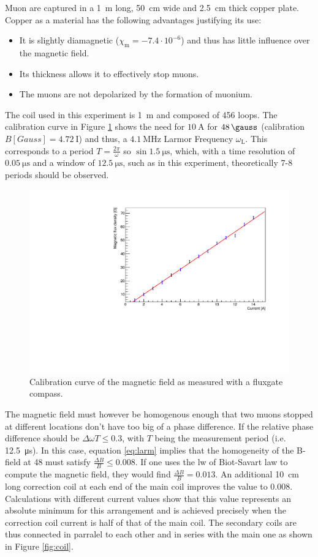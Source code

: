 Muon are captured in a \SI{1}{\meter} long, \SI{50}{\centi\meter} wide and \SI{2.5}{\centi\meter} thick copper plate. Copper as a material has the following advantages justifying its use:

\begin{itemize}
\item It is slightly diamagnetic ($\chi_{\text{m}}=-7.4 \cdot 10^{-6}$) and thus has little influence over the magnetic field.
\item Its thickness allows it to effectively stop muons.
\item The muons are not depolarized by the formation of muonium.
\end{itemize}

The coil used in this experiment is \SI{1}{\meter} and composed of 456 loops. The calibration curve in Figure \ref{fig:magcal} shows the need for $\SI{10}{\ampere}$ for $\SI{48}{\gauss}$ (calibration $B[Gauss]=\SI{4.72}{\text{I}}$) and thus, a $\SI{4.1}{\mega\hertz}$ Larmor Frequency $\omega_{\text{L}}$. This corresponds to a period $T=\frac{2\pi}{\omega}$ so $\sin \SI{1.5}{\micro\second}$, which, with a time resolution of $\SI{0.05}{\micro\second}$ and a window of $\SI{12.5}{\micro\second}$, such as in this experiment, theoretically 7-8 periods should be observed.

\begin{figure}[htbp]
\centering
\includegraphics[width=0.7\linewidth]{./fig/magcal.pdf}
\caption{Calibration curve of the magnetic field as measured with a fluxgate compass.}
\label{fig:magcal}
\end{figure}


The magnetic field must however be homogenous enough that two muons stopped at different locations don't have too big of a phase difference. If the relative phase difference should be $\Delta\omega T \leq 0.3$, with $T$ being the measurement period (i.e. \SI{12.5}{\micro\second}). In this case, equation \ref{eq:larm} implies that the homogeneity of the B-field at \SI{48}{\gauss} must satisfy $\frac{\Delta B}{B}\leq 0.008$. If one uses the lw of Biot-Savart law to compute the magnetic field, they would find $\frac{\Delta B}{B}=0.013$. An additional \SI{10}{\centi\meter} long correction coil at each end of the main coil improves the value to 0.008. Calculations with different current values show that this value represents an absolute minimum for this arrangement and is achieved precisely when the correction coil current is half of that of the main coil. The secondary coils are thus connected in parralel to each other and in series with the main one as shown in Figure \ref{fig:coil}.

